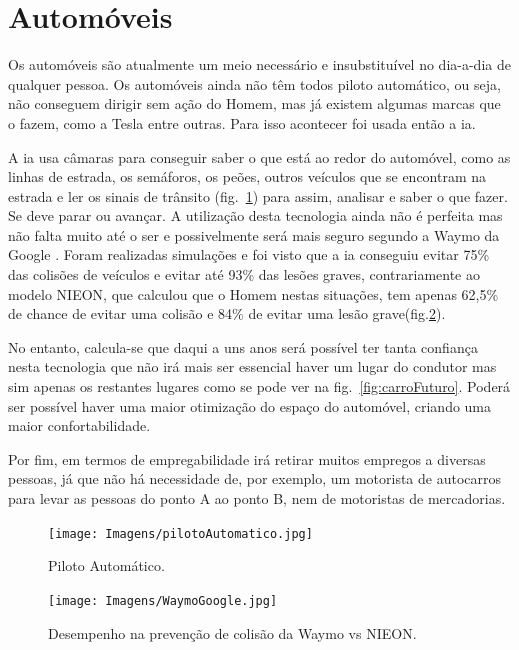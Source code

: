 \documentclass{report}
\begin{document}
\section{Automóveis}
\label{Automoveis}
Os automóveis são atualmente um meio necessário e insubstituível no dia-a-dia de qualquer pessoa. Os automóveis ainda não têm todos piloto automático, ou seja, não conseguem dirigir sem ação do Homem, mas já existem algumas marcas que o fazem, como a Tesla entre outras. 
Para isso acontecer foi usada então a \ac{ia}. 

A \ac{ia} usa câmaras para conseguir saber o que está ao redor do automóvel, como as linhas de estrada, os semáforos, os peões, outros veículos que se encontram na estrada e ler os sinais de trânsito (fig.~\ref{fig:PilotoAut}) para assim, analisar e saber o que fazer. Se deve parar ou avançar. A utilização desta tecnologia ainda não é perfeita mas não falta muito até o ser e possivelmente será mais seguro segundo a Waymo da Google \cite{Waymo:2022}. Foram realizadas simulações e foi visto que a \ac{ia} conseguiu evitar 75\% das colisões de veículos e evitar até 93\% das lesões graves, contrariamente ao modelo NIEON, que calculou que o Homem nestas situações, tem apenas 62,5\% de chance de evitar uma colisão e 84\% de evitar uma lesão grave(fig.\ref{fig:Waymo}).

No entanto, calcula-se que daqui a uns anos será possível ter tanta confiança nesta tecnologia que não irá mais ser essencial haver um lugar do condutor mas sim apenas os restantes lugares como se pode ver na fig.~\ref{fig:carroFuturo}. Poderá ser possível haver uma maior otimização do espaço do automóvel, criando uma maior confortabilidade. 

Por fim, em termos de empregabilidade irá retirar muitos empregos a diversas pessoas, já que não há necessidade de, por exemplo, um motorista de autocarros para levar as pessoas do ponto A ao ponto B, nem de motoristas de mercadorias.


\begin{figure}
    \centering  
    \texttt{[image: Imagens/pilotoAutomatico.jpg]}
    \caption{Piloto Automático.}
    \label{fig:PilotoAut}
\end{figure}

\begin{figure}
    \centering
    \texttt{[image: Imagens/WaymoGoogle.jpg]}
    \caption{Desempenho na prevenção de colisão da Waymo vs NIEON.}
    \label{fig:Waymo}
\end{figure}
\end{document}
